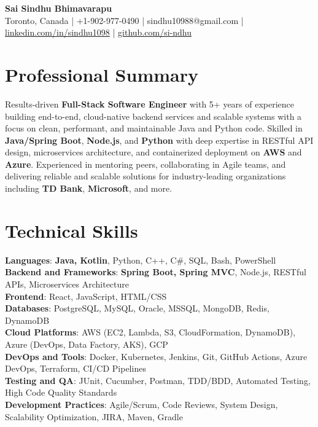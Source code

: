 \documentclass[letterpaper,11pt]{article}
\begin{document}
\begin{center}
  {\Large \textbf{Sai Sindhu Bhimavarapu}} \\
  Toronto, Canada \enspace | \enspace +1-902-977-0490 \enspace | \enspace sindhu10988@gmail.com \enspace | \enspace \href{https://www.linkedin.com/in/sindhu1098/}{linkedin.com/in/sindhu1098} \enspace | \enspace \href{https://github.com/si-ndhu}{github.com/si-ndhu}
\end{center}

\section{Professional Summary}
  \begin{itemize}[leftmargin=0.15in, label={}]
    \small{\item{
     Results-driven \textbf{Full-Stack Software Engineer} with 5+ years of experience building end-to-end, cloud-native backend services and scalable systems with a focus on clean, performant, and maintainable Java and Python code. Skilled in \textbf{Java/Spring Boot}, \textbf{Node.js}, and \textbf{Python} with deep expertise in RESTful API design, microservices architecture, and containerized deployment on \textbf{AWS} and \textbf{Azure}. Experienced in mentoring peers, collaborating in Agile teams, and delivering reliable and scalable solutions for industry-leading organizations including \textbf{TD Bank}, \textbf{Microsoft}, and more.
    }}
  \end{itemize}
\vspace{-16pt}

\section{Technical Skills}
 \begin{itemize}[leftmargin=0.15in, label={}]
    \small{\item{
     \textbf{Languages}: \textbf{Java, Kotlin}, Python, C++, C\#, SQL, Bash, PowerShell \\
     \textbf{Backend and Frameworks}: \textbf{Spring Boot, Spring MVC}, Node.js, RESTful APIs, Microservices Architecture \\
     \textbf{Frontend}: React, JavaScript, HTML/CSS \\
     \textbf{Databases}: PostgreSQL, MySQL, Oracle, MSSQL, MongoDB, Redis, DynamoDB \\
     \textbf{Cloud Platforms}: AWS (EC2, Lambda, S3, CloudFormation, DynamoDB), Azure (DevOps, Data Factory, AKS), GCP \\
     \textbf{DevOps and Tools}: Docker, Kubernetes, Jenkins, Git, GitHub Actions, Azure DevOps, Terraform, CI/CD Pipelines \\
     \textbf{Testing and QA}: JUnit, Cucumber, Postman, TDD/BDD, Automated Testing, High Code Quality Standards \\
     \textbf{Development Practices}: Agile/Scrum, Code Reviews, System Design, Scalability Optimization, JIRA, Maven, Gradle
    }}
 \end{itemize}
\vspace{-16pt}
\end{document}
